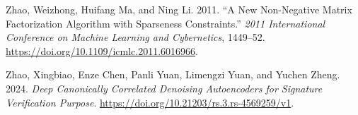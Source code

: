 \documentclass[
  letterpaper,
]{report}
\newlength{\cslhangindent}
\newenvironment{CSLReferences}[2] %
 {\begin{list}{}{%
  \setlength{\itemindent}{0pt}
  \setlength{\leftmargin}{0pt}
  \setlength{\parsep}{0pt}
  \ifodd #1
   \setlength{\leftmargin}{\cslhangindent}
   \setlength{\itemindent}{-1\cslhangindent}
  \fi
  \setlength{\itemsep}{#2\baselineskip}}}
 {\end{list}}
\begin{document}
\begin{CSLReferences}{1}{1}
Zhao, Weizhong, Huifang Ma, and Ning Li. 2011. {``A New Non-Negative
Matrix Factorization Algorithm with Sparseness Constraints.''}
\emph{2011 International Conference on Machine Learning and
Cybernetics}, 1449--52.
\url{https://doi.org/10.1109/icmlc.2011.6016966}.

Zhao, Xingbiao, Enze Chen, Panli Yuan, Limengzi Yuan, and Yuchen Zheng.
2024. \emph{Deep Canonically Correlated Denoising Autoencoders for
Signature Verification Purpose}.
\url{https://doi.org/10.21203/rs.3.rs-4569259/v1}.

\end{CSLReferences}
\end{document}
